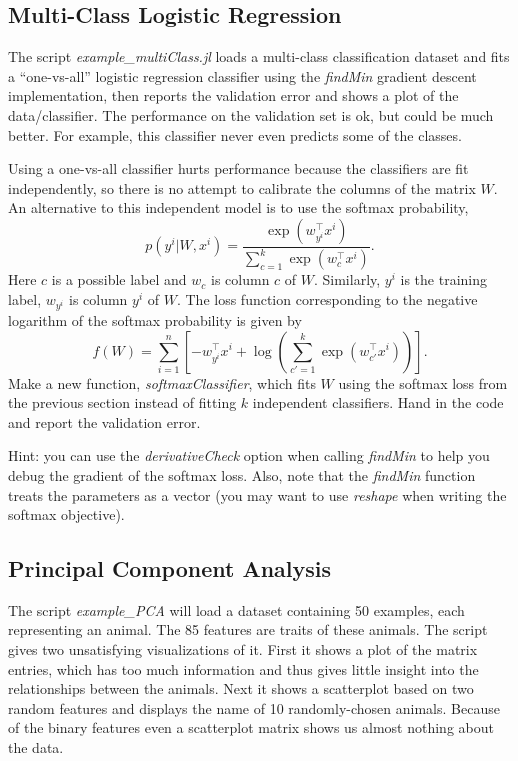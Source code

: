\documentclass{article}
\def\blu#1{{\color{blu}#1}}
\begin{document}
\subsection{Multi-Class Logistic Regression}


The script \emph{example\_multiClass.jl} loads a multi-class classification dataset and fits a ``one-vs-all'' logistic regression classifier using the \emph{findMin} gradient descent implementation, then reports the validation error and shows a plot of the data/classifier. The performance on the validation set is ok, but could be much better. For example, this classifier never even predicts some of the classes.

Using a one-vs-all classifier hurts performance because the classifiers are fit independently, so there is no attempt to calibrate the columns of the matrix $W$. An alternative to this independent model is to use the softmax probability,
\[
p(y^i | W, x^i) = \frac{\exp(w_{y^i}^\top x^i)}{\sum_{c=1}^k\exp(w_c^\top x^i)}.
\]
Here $c$ is a possible label and $w_{c}$ is column $c$ of $W$. Similarly, $y^i$ is the training label, $w_{y^i}$ is column $y^i$ of $W$. The loss function corresponding to the negative logarithm of the softmax probability is given by
\[
f(W) = \sum_{i=1}^n \left[-w_{y^i}^\top x^i + \log\left(\sum_{c' = 1}^k \exp(w_{c'}^\top x^i)\right)\right].
\]
Make a new function, \emph{softmaxClassifier}, which fits $W$ using the softmax loss from the previous section  instead of fitting $k$ independent classifiers. \blu{Hand in the code and report the validation error}.

Hint: you can use the \emph{derivativeCheck} option when calling \emph{findMin} to help you debug the gradient of the softmax loss. Also, note that the \emph{findMin} function treats the parameters as a vector (you may want to use \emph{reshape} when writing the softmax objective).

\subsection{Principal Component Analysis}

The script \emph{example\_PCA} will load a dataset containing 50 examples, each representing an animal. The 85 features are traits of these animals. The script gives two unsatisfying visualizations of it. First it shows a plot of the matrix entries, which has too much information and thus gives little insight into the relationships between the animals. Next it shows a scatterplot based on two random features and displays the name of 10 randomly-chosen animals. Because of the binary features even a scatterplot matrix shows us almost nothing about the data.
\end{document}
